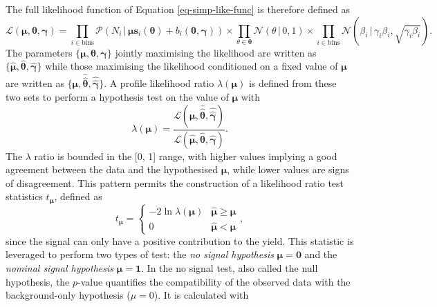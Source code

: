 The full likelihood function of Equation \ref{eq-simp-like-func} is therefore defined as
\begin{equation}
\mathcal{L}\left(\boldsymbol{\mu}, \boldsymbol{\theta}, \boldsymbol{\gamma}\right) = \prod_{i\in \textrm{bins}} \mathcal{P}(N_i \,|\, \boldsymbol{\mu} \boldsymbol{s}_i(\boldsymbol{\theta}) + b_i(\boldsymbol{\theta}, \boldsymbol{\gamma})) \times  \prod_{\theta \in \boldsymbol{\theta}} \mathcal{N}(\theta \,|\, 0, 1) \times \prod_{i \in \textrm{bins}} \mathcal{N}(\beta_i \,|\, \gamma_i \beta_i, \sqrt{\gamma_i \beta_i}).
\end{equation}
The parameters $\{\boldsymbol{\mu}, \boldsymbol{\theta}, \boldsymbol{\gamma}\}$ jointly maximising the likelihood are written as $\{\hat{\boldsymbol{\mu}}, \hat{\boldsymbol{\theta}}, \hat{\boldsymbol{\gamma}}\}$ while those maximising the likelihood conditioned on a fixed value of $\boldsymbol{\mu}$ are written as $\{\boldsymbol{\mu}, \hat{\hat{\boldsymbol{\theta}}}, \hat{\hat{\boldsymbol{\gamma}}}\}$. A profile likelihood ratio $\lambda(\boldsymbol{\mu})$  is defined from these two sets to perform a hypothesis test on the value of $\boldsymbol{\mu}$ with
\begin{equation}\label{eq-lik-ratio}
    \lambda(\boldsymbol{\mu}) = \frac{\mathcal{L}\left(\boldsymbol{\mu}, \hat{\hat{\boldsymbol{\theta}}}, \hat{\hat{\boldsymbol{\gamma}}} \right)}{\mathcal{L}\left(\hat{\boldsymbol{\mu}}, \hat{\boldsymbol{\theta}}, \hat{\boldsymbol{\gamma}} \right)}.
\end{equation}
The $\lambda$ ratio is bounded in the [0, 1] range, with higher values implying a good agreement between the data and the hypothesised $\boldsymbol{\mu}$, while lower values are signs of disagreement. This pattern permits the construction of a likelihood ratio test statistics $t_{\boldsymbol{\mu}}$, defined as \cite{asympForm}
\begin{equation}\label{eq-lik-ratio-test}
    t_{\boldsymbol{\mu}} =
      \begin{cases}
        -2 \ln \lambda(\boldsymbol{\mu}) & \hat{\boldsymbol{\mu}} \geq \boldsymbol{\mu} \\
        0 & \hat{\boldsymbol{\mu}} < \boldsymbol{\mu}
      \end{cases},
\end{equation}
since the signal can only have a positive contribution to the yield. This statistic is leveraged to perform two types of test: the \textit{no signal hypothesis} $\boldsymbol{\mu} = \boldsymbol{0}$ and the \textit{nominal signal hypothesis} $\boldsymbol{\mu} = \boldsymbol{1}$. In the no signal test, also called the null hypothesis, the $p$-value quantifies the compatibility of the observed data with the background-only hypothesis ($\mu = 0$). It is calculated with
